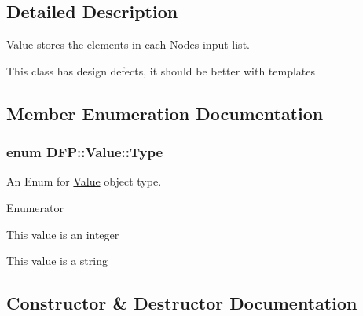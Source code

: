 \subsection{Detailed Description}
\hyperlink{class_d_f_p_1_1_value}{Value} stores the elements in each \hyperlink{class_d_f_p_1_1_node}{Node}\textquotesingle{}s input list. 

This class has design defects, it should be better with templates 

\subsection{Member Enumeration Documentation}
\subsubsection[{\texorpdfstring{Type}{Type}}]{\setlength{\rightskip}{0pt plus 5cm}enum {\bf D\+F\+P\+::\+Value\+::\+Type}}\hypertarget{class_d_f_p_1_1_value_ab50504401cc3c884a5c6eb8708f8a214}{}\label{class_d_f_p_1_1_value_ab50504401cc3c884a5c6eb8708f8a214}


An Enum for \hyperlink{class_d_f_p_1_1_value}{Value} object type. 

\begin{Desc}
\item[Enumerator]\par
\begin{description}
\item[{\em 
Int\+Type\hypertarget{class_d_f_p_1_1_value_ab50504401cc3c884a5c6eb8708f8a214a0a8aa2cb5add38d33229c160220a5456}{}\label{class_d_f_p_1_1_value_ab50504401cc3c884a5c6eb8708f8a214a0a8aa2cb5add38d33229c160220a5456}
}]This value is an integer \item[{\em 
Str\+Type\hypertarget{class_d_f_p_1_1_value_ab50504401cc3c884a5c6eb8708f8a214a07b832a0a41fd9d2402d688010a733d6}{}\label{class_d_f_p_1_1_value_ab50504401cc3c884a5c6eb8708f8a214a07b832a0a41fd9d2402d688010a733d6}
}]This value is a string \end{description}
\end{Desc}


\subsection{Constructor \& Destructor Documentation}
